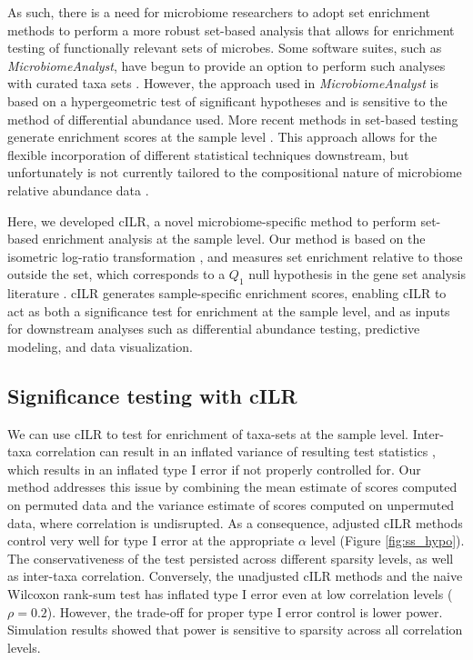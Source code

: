 \documentclass[10pt,letterpaper]{article}
\begin{document}
As such, there is a need for microbiome researchers to adopt set enrichment methods to perform a more robust set-based analysis that allows for enrichment testing of functionally relevant sets of microbes. Some software suites, such as \emph{MicrobiomeAnalyst}, have begun to provide an option to perform such analyses with curated taxa sets \cite{chong2020}. However, the approach used in \emph{MicrobiomeAnalyst} is based on a hypergeometric test of significant hypotheses and is sensitive to the method of differential abundance used. More recent methods in set-based testing generate enrichment scores at the sample level \cite{hanzelmann2013, frost2020a}. This approach allows for the flexible incorporation of different statistical techniques downstream, but unfortunately is not currently tailored to the compositional nature of microbiome relative abundance data \cite{gloor2017}. 
 
Here, we developed cILR, a novel microbiome-specific method to perform set-based enrichment analysis at the sample level. Our method is based on the isometric log-ratio transformation \cite{egozcue2003}, and measures set enrichment relative to those outside the set, which corresponds to a $Q_1$ null hypothesis in the gene set analysis literature \cite{tian2005}. cILR generates sample-specific enrichment scores, enabling cILR to act as both a significance test for enrichment at the sample level, and as inputs for downstream analyses such as differential abundance testing, predictive modeling, and data visualization. 

\subsection*{Significance testing with cILR}
We can use cILR to test for enrichment of taxa-sets at the sample level. Inter-taxa correlation can result in an inflated variance of resulting test statistics \cite{wu2012}, which results in an inflated type I error if not properly controlled for. Our method addresses this issue by combining the mean estimate of scores computed on permuted data and the variance estimate of scores computed on unpermuted data, where correlation is undisrupted. As a consequence, adjusted cILR methods control very well for type I error at the appropriate $\alpha$ level (Figure \ref{fig:ss_hypo}). The conservativeness of the test persisted across different sparsity levels, as well as inter-taxa correlation. Conversely, the unadjusted cILR methods and the naive Wilcoxon rank-sum test has inflated type I error even at low correlation levels ($\rho = 0.2$). However, the trade-off for proper type I error control is lower power. Simulation results showed that power is sensitive to sparsity across all correlation levels. 
\end{document}
